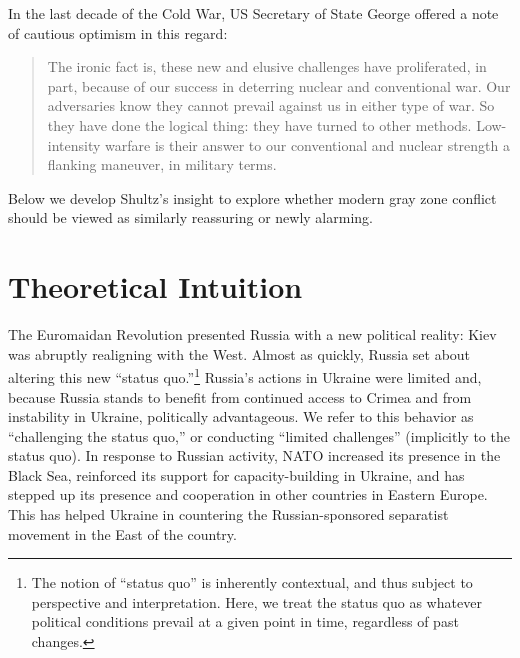 \documentclass[11pt,letterpaper,pdftex,dvipsnames,table]{article}
\begin{document}
In the last decade of the Cold War, US Secretary of State George \citet[204]{shultz_lowintensitywarfarechallenge_1986} offered a note of cautious optimism in this regard:
    
    \begin{quote}
        The ironic fact is, these new and elusive challenges have proliferated, in part, because of our success in deterring nuclear and conventional war. Our adversaries know they cannot prevail against us in either type of war. So they have done the logical thing: they have turned to other methods. Low-intensity warfare is their answer to our conventional and nuclear strength a flanking maneuver, in military terms.
    \end{quote}
    
Below we develop Shultz's insight to explore whether modern gray zone conflict should be viewed as similarly reassuring or newly alarming. 

\section{Theoretical Intuition}
The Euromaidan Revolution presented Russia with a new political reality: Kiev was abruptly realigning with the West. Almost as quickly, Russia set about altering this new ``status quo.''\footnote{The notion of ``status quo'' is inherently contextual, and thus subject to perspective and interpretation. Here, we treat the status quo as whatever political conditions prevail at a given point in time, regardless of past changes.} Russia's actions in Ukraine were limited and, because Russia stands to benefit from continued access to Crimea and from instability in Ukraine, politically advantageous. We refer to this behavior as ``challenging the status quo,'' or conducting ``limited challenges'' (implicitly to the status quo). In response to Russian activity, NATO increased its presence in the Black Sea, reinforced its support for capacity-building in Ukraine, and has stepped up its presence and cooperation in other countries in Eastern Europe. This has helped Ukraine in countering the Russian-sponsored separatist movement in the East of the country.
\end{document}
